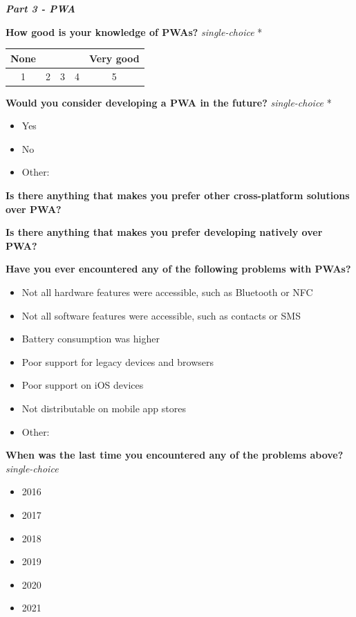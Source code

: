 \documentclass[a4paper,12pt]{article}
\begin{document}
\textbf{\textit{Part 3 - PWA}}

\textbf{How good is your knowledge of PWAs?}  \textit{single-choice} *

\begin{tabular}{ccccc}
    None & & & & Very good \\
    \hline
    \multicolumn{1}{|c|}{1} & \multicolumn{1}{c|}{2} & \multicolumn{1}{c|}{3} & \multicolumn{1}{c|}{4} & \multicolumn{1}{c|}{5} \\
     \hline
\end{tabular}

\quad

\quad

\textbf{Would you consider developing a PWA in the future?} \textit{single-choice} *
\begin{itemize}
    \item Yes
    \item No
    \item Other:
\end{itemize}

\textbf{Is there anything that makes you prefer other cross-platform solutions over PWA?}

\quad

\textbf{Is there anything that makes you prefer developing natively over PWA?}

\quad

\textbf{Have you ever encountered any of the following problems with PWAs?}
\begin{itemize}
    \item Not all hardware features were accessible, such as Bluetooth or NFC
    \item Not all software features were accessible, such as contacts or SMS
    \item Battery consumption was higher
    \item Poor support for legacy devices and browsers
    \item Poor support on iOS devices
    \item Not distributable on mobile app stores
    \item Other:
\end{itemize}

\textbf{When was the last time you encountered any of the problems above?} \textit{single-choice}
\begin{itemize}
    \item 2016
    \item 2017
    \item 2018
    \item 2019
    \item 2020
    \item 2021
\end{itemize}
\end{document}
